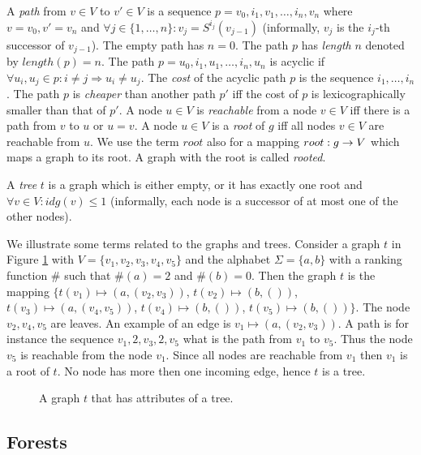 A \emph{path} from $v\in V$ to $v' \in V$ is a sequence $p=v_0, i_1, v_1, \ldots, i_n, v_n$ where $v=v_0, v' = v_n$
and $\forall j \in \{1,\ldots,n\}: v_j = S^{i_j}(v_{j-1})$ (informally, $v_j$ is the $i_j$-th successor of $v_{j-1}$).
The empty path has $n=0$.
The path $p$ has \emph{length} $n$ denoted by $length(p) = n$.
The path $p=u_0,i_1,u_1,\ldots,i_n,u_n$ is acyclic if $\forall u_i,u_j \in p: i \neq j \Rightarrow u_i \neq u_j$.
The \emph{cost} of the acyclic path $p$ is the sequence $i_1, \ldots, i_n$.
The path $p$ is \emph{cheaper} than another path $p'$ iff the cost of $p$ is lexicographically smaller than that of $p'$. 
A node $u \in V$ is \emph{reachable} from a node $v \in V$ iff there is a path from $v$ to $u$ or $u=v$.
A node $u \in V$ is a \emph{root} of $g$ iff all nodes $v \in V$ are reachable from $u$.
We use the term $root$ also for a mapping $root: g \rightarrow V$ which maps a graph to its root.
A graph with the root is called \emph{rooted}.

A \emph{tree} $t$ is a graph which is either empty, or it has exactly one root and $\forall v \in V: idg(v) \leq 1$ (informally,
each node is a successor of at most one of the other nodes).

\bexmp
We illustrate some terms related to the graphs and trees.
Consider a graph $t$ in Figure \ref{fig:graph_tree}
with $V=\{v_1,v_2,v_3,v_4,v_5\}$ and
the alphabet $\Sigma = \{a,b\}$ with a ranking function $\#$ such that $\#(a) = 2$ and $\#(b) = 0$.
Then the graph $t$ is the mapping $\{t(v_1) \mapsto (a, (v_2,v_3))$, $t(v_2) \mapsto (b, ())$,
$t(v_3) \mapsto (a, (v_4, v_5))$, $t(v_4) \mapsto (b, ())$, $t(v_5) \mapsto (b, ())\}$.
The node $v_2, v_4, v_5$ are leaves.
An example of an edge is $v_1 \mapsto (a,(v_2,v_3))$.
A path is for instance the sequence $v_1, 2, v_3, 2, v_5$
what is the path from $v_1$ to $v_5$.
Thus the node $v_5$ is reachable from the node $v_1$.
Since all nodes are reachable from $v_1$ then $v_1$ is a root of $t$.
No node has more then one incoming edge, hence $t$ is a tree.

	\begin{figure}[bth]
		\begin{center}
			
		\end{center}
		\caption{A graph $t$ that has attributes of a tree.}
		\label{fig:graph_tree}
	\end{figure}
	\label{ex:graph}
\eexmp

\subsection{Forests}
\label{subsec:forests}

